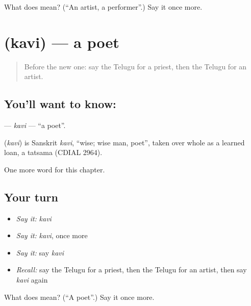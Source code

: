 \begin{tcolorbox}[breakable,colback=teal!4,colframe=teal!35!black,title={Before you move on}]
What does  mean? (\textquotedblleft{}An artist, a performer\textquotedblright{}.) Say it once more.
\end{tcolorbox}
\section[\texorpdfstring{\te{కవి} (kavi)}{కవి (kavi)}]{ (kavi) — a poet}

\label{lesson:TE-C275-kavi}



\begin{quote}
Before the new one: say the Telugu for a priest, then the Telugu for an artist.
\end{quote}

\subsection*{You'll want to know: }
\textbf{} — \emph{kavi} — \textquotedblleft{}a poet\textquotedblright{}.

\begin{cousinweb}
\textbf{} (\emph{kavi}) is Sanskrit \emph{kavi}, \textquotedblleft{}wise; wise man, poet\textquotedblright{}, taken over whole as a learned loan, a tatsama (CDIAL 2964).
\end{cousinweb}

\begin{grammarlens}[title={What you've built}]
One more word for this chapter.
\end{grammarlens}

\subsection*{Your turn}
\begin{itemize}
\raggedright
  \item \emph{Say it:} \emph{kavi}
  \item \emph{Say it:} \emph{kavi}, once more
  \item \emph{Say it:} say \emph{kavi}
  \item \emph{Recall:} say the Telugu for a priest, then the Telugu for an artist, then say \emph{kavi} again
\end{itemize}

\begin{tcolorbox}[breakable,colback=teal!4,colframe=teal!35!black,title={Before you move on}]
What does  mean? (\textquotedblleft{}A poet\textquotedblright{}.) Say it once more.
\end{tcolorbox}
